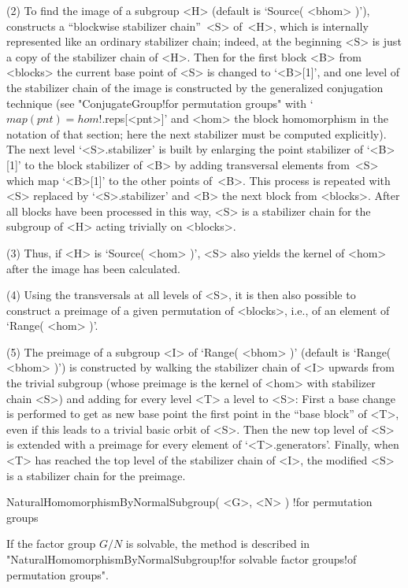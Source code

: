 (2) To find the image of a subgroup  <H> (default is `Source( <bhom> )'),
{\GAP} constructs a ``blockwise  stabilizer chain''~<S> of~<H>, which  is
internally represented like an ordinary  stabilizer chain; indeed, at the
beginning <S> is just a copy of the stabilizer chain of <H>. Then for the
first block <B> from <blocks> the current base point of <S> is changed to
`<B>[1]',  and one   level of  the  stabilizer  chain   of  the image  is
constructed  by      the    generalized conjugation     technique    (see
"ConjugateGroup!for  permutation     groups"   with      `$map(pnt)     =
hom$!.reps[<pnt>]' and <hom> the block  homomorphism  in the notation  of
that section; here the next  stabilizer must be computed explicitly). The
next level `<S>.stabilizer' is built by enlarging the point stabilizer of
`<B>[1]' to the  block stabilizer of <B>  by adding  transversal elements
from~<S> which  map `<B>[1]' to the  other points of~<B>. This process is
repeated  with <S>  replaced by  `<S>.stabilizer'  and <B> the next block
from <blocks>. After all blocks have been processed in this way, <S> is a
stabilizer chain for the subgroup of <H> acting trivially on <blocks>.

(3) Thus, if  <H> is `Source(  <hom>  )', <S>  also yields  the kernel of
<hom> after the image has been calculated.

(4) Using the transversals at all levels of <S>, it is then also possible
to construct a preimage  of a given permutation  of <blocks>, i.e., of an
element of `Range( <hom> )'.

(5) The preimage   of a subgroup <I>  of  `Range( <bhom> )'  (default  is
`Range( <bhom> )') is constructed by walking  the stabilizer chain of <I>
upwards from the trivial subgroup (whose preimage  is the kernel of <hom>
with stabilizer chain <S>) and adding for every level <T> a level to <S>:
First a base change is performed to get as new base point the first point
in the ``base block'' of <T>, even if this leads to a trivial basic orbit
of  <S>. Then the new top  level of <S> is extended  with  a preimage for
every element of `<T>.generators'. Finally, when  <T> has reached the top
level of the stabilizer  chain of <I>,  the modified <S> is a  stabilizer
chain for the preimage.

\stars

\>NaturalHomomorphismByNormalSubgroup( <G>, <N> )%
  !{for permutation groups}

If  the factor  group  $G/N$  is solvable,   the  method is described  in
"NaturalHomomorphismByNormalSubgroup!for   solvable   factor    groups!of
permutation groups".

